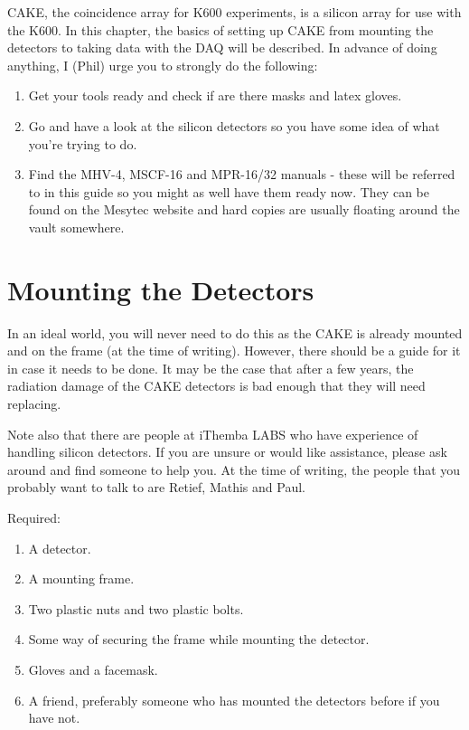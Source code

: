 \documentclass[11pt]{report}
\begin{document}
CAKE, the coincidence array for K600 experiments, is a silicon array for use with the K600. In this chapter, the basics of setting up CAKE from mounting the detectors to taking data with the DAQ will be described. In advance of doing anything, I (Phil) urge you to strongly do the following:

\begin{enumerate}
 \item Get your tools ready and check if are there masks and latex gloves.
 \item Go and have a look at the silicon detectors so you have some idea of what you're trying to do.
 \item Find the MHV-4, MSCF-16 and MPR-16/32 manuals - these will be referred to in this guide so you might as well have them ready now. They can be found on the Mesytec website and hard copies are usually floating around the vault somewhere.
\end{enumerate}

\section{Mounting the Detectors}
In an ideal world, you will never need to do this as the CAKE is already mounted and on the frame (at the time of writing). However, there should be a guide for it in case it needs to be done. It may be the case that after a few years, the radiation damage of the CAKE detectors is bad enough that they will need replacing.

Note also that there are people at iThemba LABS who have experience of handling silicon detectors. If you are unsure or would like assistance, please ask around and find someone to help you. At the time of writing, the people that you probably want to talk to are Retief, Mathis and Paul.

Required:
\begin{enumerate}
 \item A detector.
 \item A mounting frame.
 \item Two plastic nuts and two plastic bolts.
 \item Some way of securing the frame while mounting the detector.
 \item Gloves and a facemask.
 \item A friend, preferably someone who has mounted the detectors before if you have not.
\end{enumerate}
\end{document}

